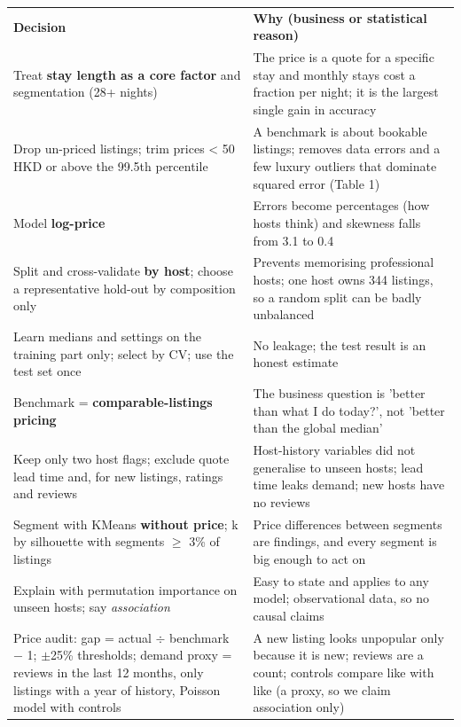\documentclass[10pt,a4paper]{article}
\begin{document}
\begin{center}{\fontsize{8}{9.6}\selectfont{}\begin{tabular}{>{\raggedright\arraybackslash}p{6.38cm}>{\raggedright\arraybackslash}p{10.18cm}}
\rowcolor{hdr}\color{white}\bfseries Decision & \color{white}\bfseries Why (business or statistical reason)\\
Treat \textbf{stay length as a core factor} and segmentation (28+ nights) & The price is a quote for a specific stay and monthly stays cost a fraction per night; it is the largest single gain in accuracy\\\hline
Drop un-priced listings; trim prices < 50 HKD or above the 99.5th percentile & A benchmark is about bookable listings; removes data errors and a few luxury outliers that dominate squared error (Table 1)\\\hline
Model \textbf{log-price} & Errors become percentages (how hosts think) and skewness falls from 3.1 to 0.4\\\hline
Split and cross-validate \textbf{by host}; choose a representative hold-out by composition only & Prevents memorising professional hosts; one host owns 344 listings, so a random split can be badly unbalanced\\\hline
Learn medians and settings on the training part only; select by CV; use the test set once & No leakage; the test result is an honest estimate\\\hline
Benchmark = \textbf{comparable-listings pricing} & The business question is 'better than what I do today?', not 'better than the global median'\\\hline
Keep only two host flags; exclude quote lead time and, for new listings, ratings and reviews & Host-history variables did not generalise to unseen hosts; lead time leaks demand; new hosts have no reviews\\\hline
Segment with KMeans \textbf{without price}; k by silhouette with segments $\geq$ 3\% of listings & Price differences between segments are findings, and every segment is big enough to act on\\\hline
Explain with permutation importance on unseen hosts; say \textit{association} & Easy to state and applies to any model; observational data, so no causal claims\\\hline
Price audit: gap = actual $\div$ benchmark $-$ 1; $\pm$25\% thresholds; demand proxy = reviews in the last 12 months, only listings with a year of history, Poisson model with controls & A new listing looks unpopular only because it is new; reviews are a count; controls compare like with like (a proxy, so we claim association only)\\\hline

\end{tabular}}
\end{center}
\end{document}
